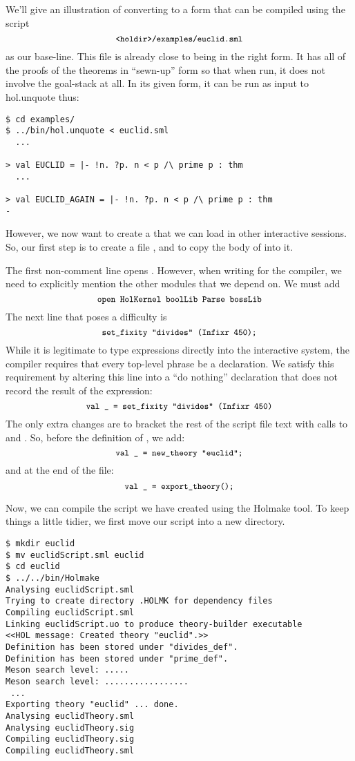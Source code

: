 We'll give an illustration of converting to a form that can be
compiled using the script
\[
  \mbox{\ml{<holdir>/examples/euclid.sml}}
\] as our base-line.  This
file is already close to being in the right form.  It has all of the
proofs of the theorems in ``sewn-up'' form so that when run, it does
not involve the goal-stack at all.  In its given form, it can be run
as input to \textsf{hol.unquote} thus:

\setcounter{sessioncount}{0}
\begin{session}
\begin{verbatim}
$ cd examples/
$ ../bin/hol.unquote < euclid.sml
  ...

> val EUCLID = |- !n. ?p. n < p /\ prime p : thm
  ...

> val EUCLID_AGAIN = |- !n. ?p. n < p /\ prime p : thm
-
\end{verbatim}
\end{session}

However, we now want to create a  that we can load in
other interactive sessions.  So, our first step is to create a file
, and to copy the body of  into
it.

The first non-comment line opens .  However, when
writing for the compiler, we need to explicitly mention the other
\HOL{} modules that we depend on.  We must add
\[
\mbox{\ml{open HolKernel boolLib Parse bossLib}}
\]
The next line that poses a difficulty is
\[
  \mbox{\ml{set\_fixity "divides" (Infixr 450);}}
\]
While it is legitimate to type expressions directly into the
interactive system, the compiler requires that every top-level phrase
be a declaration.  We satisfy this requirement by altering this line
into a ``do nothing'' declaration that does not record the result of
the expression:
\[
\mbox{\ml{val \_{} = set\_fixity "divides" (Infixr 450)}}
\]
The only extra changes are to bracket the rest of the script file text
with calls to  and .  So,
before the definition of , we add:
\[
\mbox{\ml{val \_{} = new\_theory "euclid";}}
\]
and at the end of the file:
\[
\mbox{\ml{val \_{} = export\_theory();}}
\]

Now, we can compile the script we have created using the
\textsf{Holmake} tool.  To keep things a little tidier, we first move
our script into a new directory.

\begin{session}
\begin{verbatim}
$ mkdir euclid
$ mv euclidScript.sml euclid
$ cd euclid
$ ../../bin/Holmake
Analysing euclidScript.sml
Trying to create directory .HOLMK for dependency files
Compiling euclidScript.sml
Linking euclidScript.uo to produce theory-builder executable
<<HOL message: Created theory "euclid".>>
Definition has been stored under "divides_def".
Definition has been stored under "prime_def".
Meson search level: .....
Meson search level: .................
 ...
Exporting theory "euclid" ... done.
Analysing euclidTheory.sml
Analysing euclidTheory.sig
Compiling euclidTheory.sig
Compiling euclidTheory.sml
\end{verbatim}
\end{session}

